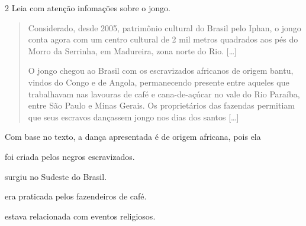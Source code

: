 \num{2} Leia com atenção infomações sobre o jongo.

\begin{quote}
Considerado, desde 2005, patrimônio cultural do Brasil pelo Iphan, o
  jongo conta agora com um centro cultural de 2 mil metros quadrados aos
  pés do Morro da Serrinha, em Madureira, zona norte do Rio. {[}\ldots{}{]}

O jongo chegou ao Brasil com os escravizados africanos de origem bantu,
vindos do Congo e de Angola, permanecendo presente entre aqueles que
trabalhavam nas lavouras de café e cana-de-açúcar no vale do Rio
Paraíba, entre São Paulo e Minas Gerais. Os proprietários das fazendas
permitiam que seus escravos dançassem jongo nos dias dos santos {[}\ldots{}{]}

\end{quote}

\noindent{}Com base no texto, a dança apresentada é de origem africana, pois ela

\begin{escolha}
\item foi criada pelos negros escravizados.

\item surgiu no Sudeste do Brasil.

\item era praticada pelos fazendeiros de café.

\item estava relacionada com eventos religiosos.
\end{escolha}


